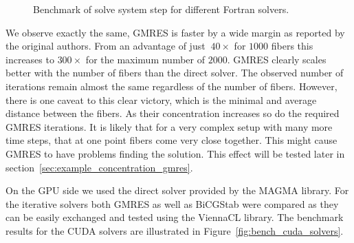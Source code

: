 \begin{figure}[!htbp]
  \centering
  \caption{Benchmark of solve system step for different Fortran solvers.}
  \label{fig:bench_openmp_solvers}
\end{figure}

We observe exactly the same, GMRES is faster by a wide margin as reported by the original authors\cite{Tornberg2006}. From an advantage of just $~40×$ for $1000$ fibers this increases to $300×$ for the maximum number of $2000$. GMRES clearly scales better with the number of fibers than the direct solver. The observed number of iterations remain almost the same regardless of the number of fibers. However, there is one caveat to this clear victory, which is the minimal and average distance between the fibers. As their concentration increases so do the required GMRES iterations. It is likely that for a very complex setup with many more time steps, that at one point fibers come very close together. This might cause GMRES to have problems finding the solution. This effect will be tested later in section~\ref{sec:example_concentration_gmres}.

On the GPU side we used the direct solver provided by the MAGMA library. For the iterative solvers both GMRES as well as BiCGStab were compared as they can be easily exchanged and tested using the ViennaCL library. The benchmark results for the CUDA solvers are illustrated in Figure~\ref{fig:bench_cuda_solvers}.

